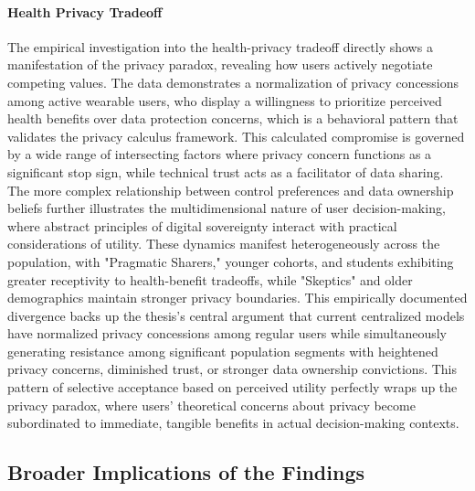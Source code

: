 	\paragraph{Health Privacy Tradeoff}
	The empirical investigation into the health-privacy tradeoff directly shows a manifestation of the privacy paradox, revealing how users actively negotiate competing values. The data demonstrates a normalization of privacy concessions among active wearable users, who display a willingness to prioritize perceived health benefits over data protection concerns, which is a behavioral pattern that validates the privacy calculus framework. This calculated compromise is governed by a wide range of intersecting factors where privacy concern functions as a significant stop sign, while technical trust acts as a facilitator of data sharing. The more complex relationship between control preferences and data ownership beliefs further illustrates the multidimensional nature of user decision-making, where abstract principles of digital sovereignty interact with practical considerations of utility. These dynamics manifest heterogeneously across the population, with "Pragmatic Sharers," younger cohorts, and students exhibiting greater receptivity to health-benefit tradeoffs, while "Skeptics" and older demographics maintain stronger privacy boundaries. This empirically documented divergence backs up the thesis's central argument that current centralized models have normalized privacy concessions among regular users while simultaneously generating resistance among significant population segments with heightened privacy concerns, diminished trust, or stronger data ownership convictions. This pattern of selective acceptance based on perceived utility perfectly wraps up the privacy paradox, where users' theoretical concerns about privacy become subordinated to immediate, tangible benefits in actual decision-making contexts.
\subsection{Broader Implications of the Findings}
